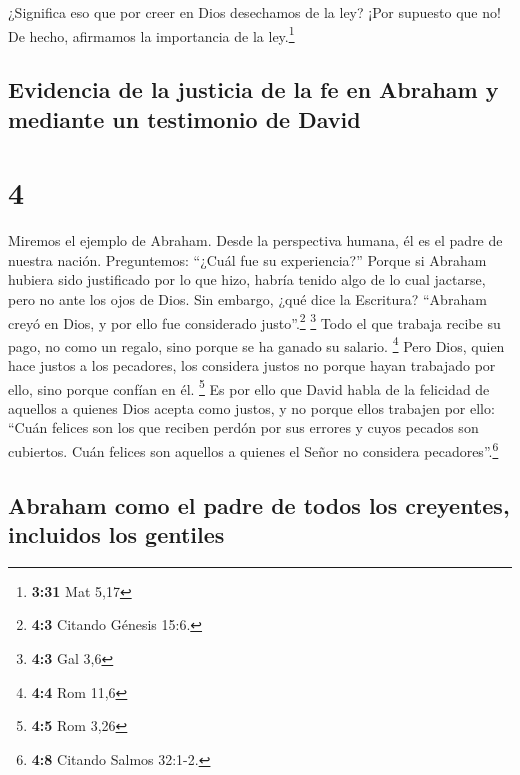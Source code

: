  ¿Significa eso que por creer en Dios desechamos de la
ley? ¡Por supuesto que no! De hecho, afirmamos la importancia de la
ley.\footnote{\textbf{3:31} Mat 5,17}

\hypertarget{evidencia-de-la-justicia-de-la-fe-en-abraham-y-mediante-un-testimonio-de-david}{%
\subsection{Evidencia de la justicia de la fe en Abraham y mediante un
testimonio de
David}\label{evidencia-de-la-justicia-de-la-fe-en-abraham-y-mediante-un-testimonio-de-david}}

\hypertarget{section-3}{%
\section{4}\label{section-3}}

 Miremos el ejemplo de Abraham. Desde la perspectiva
humana, él es el padre de nuestra nación. Preguntemos: ``¿Cuál fue su
experiencia?''  Porque si Abraham hubiera sido justificado
por lo que hizo, habría tenido algo de lo cual jactarse, pero no ante
los ojos de Dios.  Sin embargo, ¿qué dice la Escritura?
``Abraham creyó en Dios, y por ello fue considerado justo''.\footnote{\textbf{4:3}
  Citando Génesis 15:6.} \footnote{\textbf{4:3} Gal 3,6} 
Todo el que trabaja recibe su pago, no como un regalo, sino porque se ha
ganado su salario. \footnote{\textbf{4:4} Rom 11,6}  Pero
Dios, quien hace justos a los pecadores, los considera justos no porque
hayan trabajado por ello, sino porque confían en él. \footnote{\textbf{4:5}
  Rom 3,26}  Es por ello que David habla de la felicidad
de aquellos a quienes Dios acepta como justos, y no porque ellos
trabajen por ello:  ``Cuán felices son los que reciben
perdón por sus errores y cuyos pecados son cubiertos. 
Cuán felices son aquellos a quienes el Señor no considera
pecadores''.\footnote{\textbf{4:8} Citando Salmos 32:1-2.}

\hypertarget{abraham-como-el-padre-de-todos-los-creyentes-incluidos-los-gentiles}{%
\subsection{Abraham como el padre de todos los creyentes, incluidos los
gentiles}\label{abraham-como-el-padre-de-todos-los-creyentes-incluidos-los-gentiles}}

